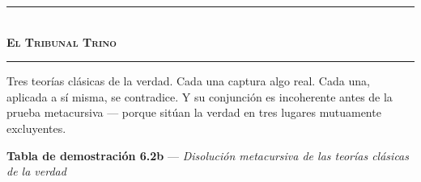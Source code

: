 \documentclass[10pt, openany, oneside]{book}
\renewcommand{\normalsize}{\fontsize{10}{13}\selectfont}
\begin{document}
\begin{center}
    \rule{0.3\textwidth}{0.4pt}\\[0.5em]
    {\normalsize\bfseries\scshape El Tribunal Trino}\\[0.3em]
    \rule{0.3\textwidth}{0.4pt}
\end{center}

\vspace{1em}

\noindent Tres teorías clásicas de la verdad. Cada una captura algo real. Cada una, aplicada a sí misma, se contradice. Y su conjunción es incoherente antes de la prueba metacursiva --- porque sitúan la verdad en tres lugares mutuamente excluyentes.

\vspace{0.5em}

\textbf{Tabla de demostración 6.2b} --- \textit{Disolución metacursiva de las teorías clásicas de la verdad}

\vspace{0.5em}
\end{document}
